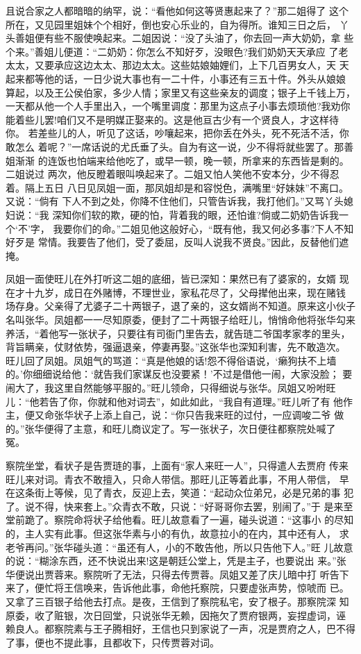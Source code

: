 且说合家之人都暗暗的纳罕，说：“看他如何这等贤惠起来了？”那二姐得了
这个所在，又见园里姐妹个个相好，倒也安心乐业的，自为得所。谁知三日之后，
丫头善姐便有些不服使唤起来。二姐因说：“没了头油了，你去回一声大奶奶，拿
些个来。”善姐儿便道：“二奶奶：你怎么不知好歹，没眼色?我们奶奶天天承应
了老太太，又要承应这边太太、那边太太。这些姑娘妯娌们，上下几百男女人，天
天起来都等他的话，一日少说大事也有一二十件，小事还有三五十件。外头从娘娘
算起，以及王公侯伯家，多少人情；家里又有这些亲友的调度；银子上千钱上万，
一天都从他一个人手里出入，一个嘴里调度：那里为这点子小事去烦琐他?我劝你
能着些儿罢!咱们又不是明媒正娶来的。这是他亘古少有一个贤良人，才这样待你。
若差些儿的人，听见了这话，吵嚷起来，把你丢在外头，死不死活不活，你敢怎么
着呢？”一席话说的尤氏垂了头。自为有这一说，少不得将就些罢了。那善姐渐渐
的连饭也怕端来给他吃了，或早一顿，晚一顿，所拿来的东西皆是剩的。二姐说过
两次，他反瞪着眼叫唤起来了。二姐又怕人笑他不安本分，少不得忍着。隔上五日
八日见凤姐一面，那凤姐却是和容悦色，满嘴里“好妹妹”不离口。又说：“倘有
下人不到之处，你降不住他们，只管告诉我，我打他们。”又骂丫头媳妇说：“我
深知你们软的欺，硬的怕，背着我的眼，还怕谁?倘或二奶奶告诉我一个‘不’字，
我要你们的命。”二姐见他这般好心，“既有他，我又何必多事?下人不知好歹是
常情。我要告了他们，受了委屈，反叫人说我不贤良。”因此，反替他们遮掩。

凤姐一面使旺儿在外打听这二姐的底细，皆已深知：果然已有了婆家的，女婿
现在才十九岁，成日在外赌博，不理世业，家私花尽了，父母撵他出来，现在赌钱
场存身。父亲得了尤婆子二十两银子，退了亲的，这女婿尚不知道。原来这小伙子
名叫张华。凤姐都一一尽知原委，便封了二十两银子给旺儿，悄悄命他将张华勾来
养活，“着他写一张状子，只要往有司衙门里告去，就告琏二爷国孝家孝的里头，
背旨瞒亲，仗财依势，强逼退亲，停妻再娶。”这张华也深知利害，先不敢造次。
旺儿回了凤姐。凤姐气的骂道：“真是他娘的话!怨不得俗语说，‘癞狗扶不上墙
的。’你细细说给他：‘就告我们家谋反也没要紧！’不过是借他一闹，大家没脸；
要闹大了，我这里自然能够平服的。”旺儿领命，只得细说与张华。凤姐又吩咐旺
儿：“他若告了你，你就和他对词去”，如此如此，“我自有道理。”旺儿听了有
他作主，便又命张华状子上添上自己，说：“你只告我来旺的过付，一应调唆二爷
做的。”张华便得了主意，和旺儿商议定了。写一张状子，次日便往都察院处喊了
冤。

察院坐堂，看状子是告贾琏的事，上面有“家人来旺一人”，只得遣人去贾府
传来旺儿来对词。青衣不敢擅入，只命人带信。那旺儿正等着此事，不用人带信，
早在这条街上等候，见了青衣，反迎上去，笑道：“起动众位弟兄，必是兄弟的事
犯了。说不得，快来套上。”众青衣不敢，只说：“好哥哥你去罢，别闹了。”于
是来至堂前跪了。察院命将状子给他看。旺儿故意看了一遍，碰头说道：“这事小
的尽知的，主人实有此事。但这张华素与小的有仇，故意拉小的在内，其中还有人，
求老爷再问。”张华碰头道：“虽还有人，小的不敢告他，所以只告他下人。”旺
儿故意的说：“糊涂东西，还不快说出来!这是朝廷公堂上，凭是主子，也要说出
来。”张华便说出贾蓉来。察院听了无法，只得去传贾蓉。凤姐又差了庆儿暗中打
听告下来了，便忙将王信唤来，告诉他此事，命他托察院，只要虚张声势，惊唬而
已。又拿了三百银子给他去打点。是夜，王信到了察院私宅，安了根子。那察院深
知原委，收了赃银，次日回堂，只说张华无赖，因拖欠了贾府银两，妄捏虚词，诬
赖良人。都察院素与王子腾相好，王信也只到家说了一声，况是贾府之人，巴不得
了事，便也不提此事，且都收下，只传贾蓉对词。

